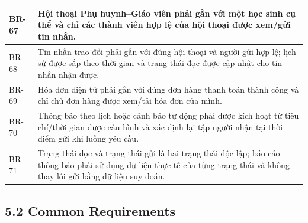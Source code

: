 \documentclass[12pt,a4paper,oneside]{report}
\begin{document}
\begin{longtable}{|p{1.6cm}|p{12.7cm}|}
BR-67 & Hội thoại Phụ huynh--Giáo viên phải gắn với một học sinh cụ thể và chỉ các thành viên hợp lệ của hội thoại được xem/gửi tin nhắn. \\ \hline
BR-68 & Tin nhắn trao đổi phải gắn với đúng hội thoại và người gửi hợp lệ; lịch sử được sắp theo thời gian và trạng thái đọc được cập nhật cho tin nhắn nhận được. \\ \hline
BR-69 & Hóa đơn điện tử phải gắn với đúng đơn hàng thanh toán thành công và chỉ chủ đơn hàng được xem/tải hóa đơn của mình. \\ \hline
BR-70 & Thông báo theo lịch hoặc cảnh báo tự động phải được kích hoạt từ tiêu chí/thời gian được cấu hình và xác định lại tập người nhận tại thời điểm gửi khi luồng yêu cầu. \\ \hline
BR-71 & Trạng thái đọc và trạng thái gửi là hai trạng thái độc lập; báo cáo thông báo phải sử dụng dữ liệu thực tế của từng trạng thái và không thay lỗi gửi bằng dữ liệu suy đoán. \\ \hline
\end{longtable}

\subsection*{5.2 Common Requirements}
\end{document}
